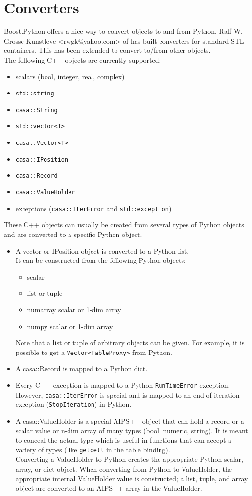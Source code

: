 \section{Converters}
Boost.Python offers a nice way to convert objects to and from Python.
Ralf W. Grosse-Kunstleve <rwgk@yahoo.com> of
has built converters for standard STL containers. This has been
extended to convert to/from other objects.
\\The following C++ objects are currently supported:
\begin{itemize}
  \item scalars (bool, integer, real, complex)
  \item \texttt{std::string}
  \item \texttt{casa::String}
  \item \texttt{std::vector<T>}
  \item \texttt{casa::Vector<T>}
  \item \texttt{casa::IPosition}
  \item \texttt{casa::Record}
  \item \texttt{casa::ValueHolder}
  \item exceptions (\texttt{casa::IterError} and \texttt{std::exception})
\end{itemize}
These C++ objects can usually be created from several types of Python
objects and are converted to a specific Python object.
\begin{itemize}
\item
A vector or IPosition object is converted to a Python list.
\\It can be constructed from the following Python objects:
\begin{itemize}
  \item scalar
  \item list or tuple
  \item numarray scalar or 1-dim array
  \item numpy scalar or 1-dim array
\end{itemize}
Note that a list or tuple of arbitrary objects can be given. For
example, it is possible to get a \texttt{Vector<TableProxy>} from Python.
\item
A casa::Record is mapped to a Python dict.
\item
Every C++ exception is mapped to a Python \texttt{RunTimeError}
exception. However, \texttt{casa::IterError} is special and 
is mapped to an end-of-iteration exception (\texttt{StopIteration}) in Python.
\item
A casa::ValueHolder is a special AIPS++ object that can hold a record or
a scalar value or n-dim array of many types (bool, numeric, string).
It is meant to conceal the actual type which is useful in functions
that can accept a variety of types (like \texttt{getcell}
in the table binding).
\\Converting a ValueHolder to Python creates the appropriate Python
scalar, array, or dict object. When converting from
Python to ValueHolder, the appropriate internal ValueHolder value
is constructed; a list, tuple, and array object are converted to an
AIPS++ array in the ValueHolder.
\end{itemize}
